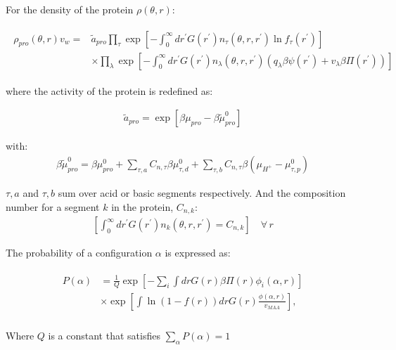 	
For the density of the protein $\rho(\theta,r)$:
	
	
	
	\begin{align}
		\begin{aligned}
			\rho_{pro}(\theta, r)v_w = & \tilde{a}_{pro} \prod_\tau \exp\left[ -\int_0^\infty dr^\prime G(r^\prime) n_\tau(\theta,r,r^\prime) \ln f_\tau(r^\prime)\right] \\
			& \times \prod_\lambda \exp\left[ -\int_0^\infty dr^\prime G(r^\prime) n_\lambda(\theta,r,r^\prime)\left(q_\lambda \beta\psi(r^\prime) + v_\lambda \beta \Pi(r^\prime)\right)\right]
		\end{aligned}
	\end{align}
	
	\noindent where the activity of the protein is redefined as:
	
	\begin{align}
		\tilde{a}_{pro} = \exp[\beta\mu_{pro} - \beta\tilde{\mu}^0_{pro}]
	\end{align}
	
	with:
\begin{align}
	\beta\tilde{\mu}^0_{pro} =  \beta \mu^0_{pro}  + \sum_{\tau,a} C_{n,\tau}\beta\mu^0_{\tau,d} 
	+ \sum_{\tau,b} C_{n,\tau}\beta(\mu_{H^+} - \mu^0_{\tau,p})
\end{align}


\noindent $\tau,a$ and $\tau,b$ sum over acid or basic segments respectively. And the composition number for a segment $k$ in the protein, $C_{n,k}$:
	\begin{align}
		\left[\int_0^\infty dr^\prime G(r^\prime) n_k(\theta,r,r^\prime) = C_{n,k}\right] \quad \forall \, r
		\label{eq:esf:composition}
	\end{align}
	
	
	The probability of a configuration $\alpha$ is expressed as:
	
	\begin{align}
		\begin{aligned}
			P(\alpha)&=\frac{1}{Q}\exp\left[- \sum_i{\int{drG(r)\beta\Pi(r)\phi_i(\alpha,r)}}\right] \\
			& \times \exp\left[\int{\ln(1-f(r))drG(r)\frac{\phi(\alpha,r)}{v_{MAA}}}\right], \\
		\end{aligned}
	\end{align}
	
	\noindent Where $Q$ is a constant that satisfies $\sum_\alpha P(\alpha) = 1$
	
